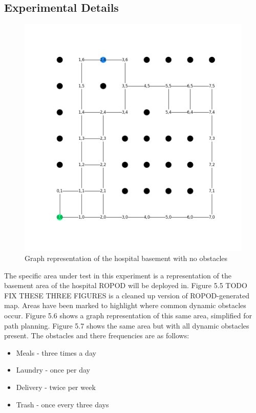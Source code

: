   \clearpage


  \subsection{ Experimental Details }

  \begin{figure}[!htb]
    \centering
    \includegraphics[width=\linewidth]{images/results/Empty_Hospital.png}
    \caption{Graph representation of the hospital basement with no obstacles}
    \label{figure:basement_congestion_empty}
  \end{figure}

  The specific area under test in this experiment is a representation
  of the basement area of the hospital ROPOD will be deployed in. Figure 5.5 TODO FIX THESE THREE FIGURES
  is a cleaned up version of ROPOD-generated map. Areas have been marked
  to highlight where common dynamic obstacles occur. Figure 5.6 shows a graph
  representation of this same area, simplified for path planning. Figure 5.7
  shows the same area but with all dynamic obstacles present. The obstacles
  and there frequencies are as follows: \\

  \begin{itemize}

    \item Meals - three times a day

    \item Laundry - once per day

    \item Delivery - twice per week

    \item Trash - once every three days

  \end{itemize}

